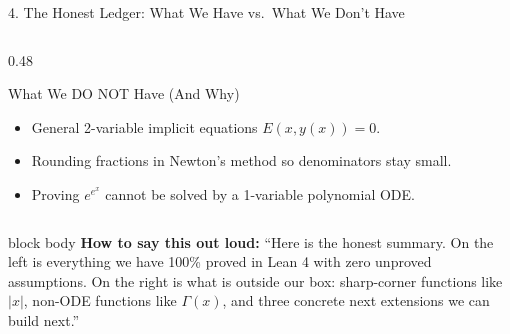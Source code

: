 \documentclass[aspectratio=169,11pt]{beamer}
\newcommand{\say}[1]{%
  \vfill
  \begin{beamercolorbox}[sep=5pt,rounded=true,shadow=false]{block body}
  {\footnotesize \textbf{\textcolor{deepblue}{How to say this out loud:}} ``#1''}
  \end{beamercolorbox}
}
\begin{document}
\begin{frame}[shrink=8]{4. The Honest Ledger: What We Have vs.\ What We Don't Have}
\begin{columns}[T]
\begin{column}{0.48\textwidth}
\begin{block}{\textcolor{warnred}{What We DO NOT Have (And Why)}}
\begin{enumerate}
            \begin{itemize}
              \item General 2-variable implicit equations $E(x, y(x)) = 0$.
              \item Rounding fractions in Newton's method so denominators stay small.
              \item Proving $e^{e^x}$ cannot be solved by a 1-variable polynomial ODE.
            \end{itemize}
        \end{enumerate}
      \end{block}
    \end{column}
  \end{columns}

  \say{Here is the honest summary. On the left is everything we have 100\% proved in Lean 4 with zero unproved assumptions. On the right is what is outside our box: sharp-corner functions like $|x|$, non-ODE functions like $\Gamma(x)$, and three concrete next extensions we can build next.}
\end{frame}
\end{document}
